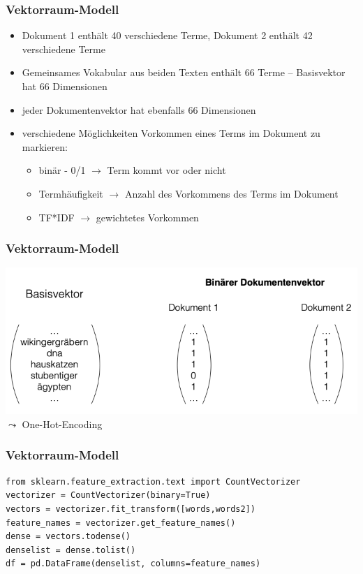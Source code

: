     
\begin{frame}
    \frametitle{Vektorraum-Modell}
    \begin{itemize}
    \item Dokument 1 enthält 40 verschiedene Terme, Dokument 2 enthält 42 verschiedene Terme
    \item Gemeinsames Vokabular aus beiden Texten enthält 66 Terme -- Basisvektor hat 66 Dimensionen
    \item jeder Dokumentenvektor hat ebenfalls 66 Dimensionen
    \item verschiedene Möglichkeiten Vorkommen eines Terms im Dokument zu markieren:
    \begin{itemize}
    \item binär - 0/1  $\rightarrow$ Term kommt vor oder nicht
    \item Termhäufigkeit  $\rightarrow$ Anzahl des Vorkommens des Terms im Dokument
    \item TF*IDF  $\rightarrow$ gewichtetes Vorkommen
    \end{itemize}
    \end{itemize}
\end{frame}
    
    
\begin{frame}
    \frametitle{Vektorraum-Modell}
    \vspace{1.5cm}
    \includegraphics[width=\linewidth]{fig8/binaervektor}
    $\leadsto$ One-Hot-Encoding
\end{frame}
    
    
\begin{frame}[fragile]
    \frametitle{Vektorraum-Modell}
    
    \begin{verbatim}
from sklearn.feature_extraction.text import CountVectorizer
vectorizer = CountVectorizer(binary=True)
vectors = vectorizer.fit_transform([words,words2])
feature_names = vectorizer.get_feature_names()
dense = vectors.todense()
denselist = dense.tolist()
df = pd.DataFrame(denselist, columns=feature_names)
    \end{verbatim}
\end{frame}
      
